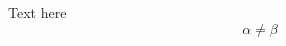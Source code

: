 \documentclass{article}
\begin{document}
Text here
\begin{equation}
    \alpha \neq \beta
\end{equation}
\end{document}
